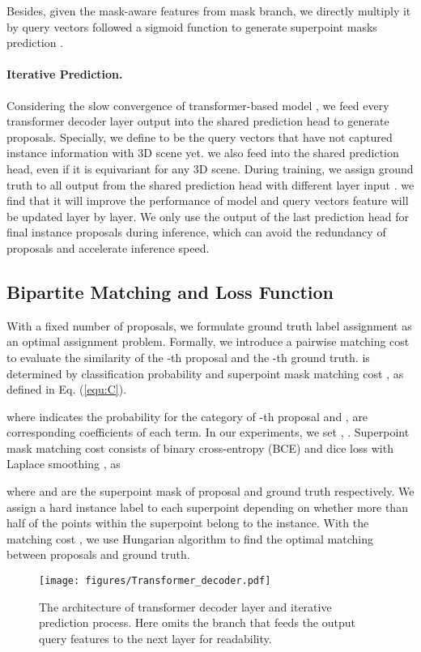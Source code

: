 \documentclass[letterpaper]{article} \usepackage{aaai23}  \usepackage{times}  \usepackage{helvet}  \usepackage{courier}  \usepackage[hyphens]{url}  \usepackage{graphicx} \urlstyle{rm} \def\UrlFont{\rm}  \usepackage{natbib}  \usepackage{caption} \frenchspacing  \setlength{\pdfpagewidth}{8.5in}  \setlength{\pdfpageheight}{11in}  \usepackage{algorithm}
\begin{document}
Besides, given the mask-aware features  from mask branch, we directly multiply it by query vectors  followed a sigmoid function to generate superpoint masks prediction .

\paragraph{Iterative Prediction.} Considering the slow convergence of transformer-based model \cite{detr}, we feed every transformer decoder layer output  into the shared prediction head to generate proposals. Specially, we define  to be the query vectors that have not captured instance information with 3D scene yet. we also feed  into the shared prediction head, even if it is equivariant for any 3D scene. During training, we assign ground truth to all output from the shared prediction head with different layer input . we find that it will improve the performance of model and query vectors feature will be updated layer by layer. We only use the output of the last prediction head for final instance proposals during inference, which can avoid the redundancy of proposals and accelerate inference speed. 

\subsection{Bipartite Matching and Loss Function}
\label{sec:bl}
With a fixed number of proposals, we formulate ground truth label assignment as an optimal assignment problem. Formally, we introduce a pairwise matching cost  to evaluate the similarity of the -th proposal and the -th ground truth.  is determined by classification probability and superpoint mask matching cost , as defined in Eq. (\ref{equ:C}).

where  indicates the probability for the category  of -th proposal and ,  are corresponding coefficients of each term. In our experiments, we set , . Superpoint mask matching cost  consists of binary cross-entropy (BCE) and dice loss with Laplace smoothing \cite{VNet}, as

where  and  are the superpoint mask of proposal and ground truth respectively. We assign a hard instance label to each superpoint depending on whether more than half of the points within the superpoint belong to the instance. With the matching cost , we use Hungarian algorithm \cite{hungarian} to find the optimal matching between proposals and ground truth.

\begin{figure}[t]
    \centering
    \texttt{[image: figures/Transformer\_decoder.pdf]}
    \caption{The architecture of transformer decoder layer and iterative prediction process. Here omits the branch that feeds the output query features  to the next layer for readability.}
    \label{fig:decoder}
\end{figure}
\end{document}
